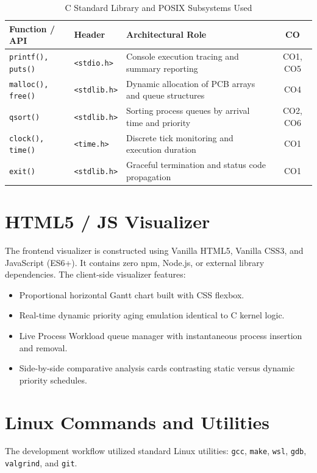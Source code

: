 \documentclass[12pt,a4paper]{report}
\begin{document}
\begin{table}[H]
\centering
\caption{C Standard Library and POSIX Subsystems Used}
\label{tab:syscalls}
\small
\begin{tabularx}{\textwidth}{|p{2.8cm}|p{2.4cm}|X|c|}
\hline
\rowcolor{codebg}
\textbf{Function / API} & \textbf{Header} & \textbf{Architectural Role} & \textbf{CO} \\
\hline
\texttt{printf(), puts()} & \texttt{<stdio.h>} & Console execution tracing and summary reporting & CO1, CO5 \\
\hline
\texttt{malloc(), free()} & \texttt{<stdlib.h>} & Dynamic allocation of PCB arrays and queue structures & CO4 \\
\hline
\texttt{qsort()} & \texttt{<stdlib.h>} & Sorting process queues by arrival time and priority & CO2, CO6 \\
\hline
\texttt{clock(), time()} & \texttt{<time.h>} & Discrete tick monitoring and execution duration & CO1 \\
\hline
\texttt{exit()} & \texttt{<stdlib.h>} & Graceful termination and status code propagation & CO1 \\
\hline
\end{tabularx}
\end{table}

\section{HTML5 / JS Visualizer}
The frontend visualizer is constructed using Vanilla HTML5, Vanilla CSS3, and JavaScript (ES6+). It contains zero npm, Node.js, or external library dependencies. The client-side visualizer features:
\begin{itemize}[leftmargin=1.5em, itemsep=2pt]
  \item Proportional horizontal Gantt chart built with CSS flexbox.
  \item Real-time dynamic priority aging emulation identical to C kernel logic.
  \item Live Process Workload queue manager with instantaneous process insertion and removal.
  \item Side-by-side comparative analysis cards contrasting static versus dynamic priority schedules.
\end{itemize}

\section{Linux Commands and Utilities}
The development workflow utilized standard Linux utilities: \texttt{gcc}, \texttt{make}, \texttt{wsl}, \texttt{gdb}, \texttt{valgrind}, and \texttt{git}.
\end{document}
